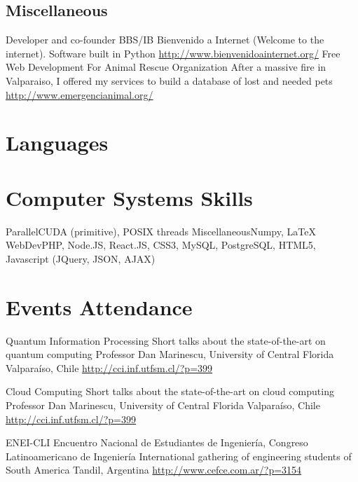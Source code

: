 \documentclass[11pt,a4paper,sans]{moderncv}
\begin{document}
\subsection{Miscellaneous}


        {Developer and co-founder}
        {BBS/IB Bienvenido a Internet (Welcome to the internet). Software built in Python}
        {}
        {}
        {\url{http://www.bienvenidoainternet.org/}}
        {Free Web Development For Animal Rescue Organization}
        {After a massive fire in Valparaiso, I offered my services to build a database of lost and needed pets}
        {}
        {}
        {\url{http://www.emergencianimal.org/}}

\section{Languages}

\section{Computer Systems Skills}
           {Parallel}{CUDA (primitive), POSIX threads}
           {Miscellaneous}{Numpy, \LaTeX}
           {WebDev}{PHP, Node.JS, React.JS, CSS3, MySQL, PostgreSQL, HTML5, Javascript (JQuery, JSON, AJAX)}

\section{Events Attendance}

        {Quantum Information Processing}
        {Short talks about the state-of-the-art on quantum computing}
        {Professor Dan Marinescu, University of Central Florida}
        {Valparaíso, Chile}
        {\url{http://cci.inf.utfsm.cl/?p=399}}

        {Cloud Computing}
        {Short talks about the state-of-the-art on cloud computing}
        {Professor Dan Marinescu, University of Central Florida}
        {Valparaíso, Chile}
        {\url{http://cci.inf.utfsm.cl/?p=399}}

        {ENEI-CLI}
        {Encuentro Nacional de Estudiantes de Ingeniería, Congreso Latinoamericano de Ingeniería}
        {International gathering of engineering students of South America}
        {Tandil, Argentina \url{http://www.cefce.com.ar/?p=3154}}
        {}
\end{document}

